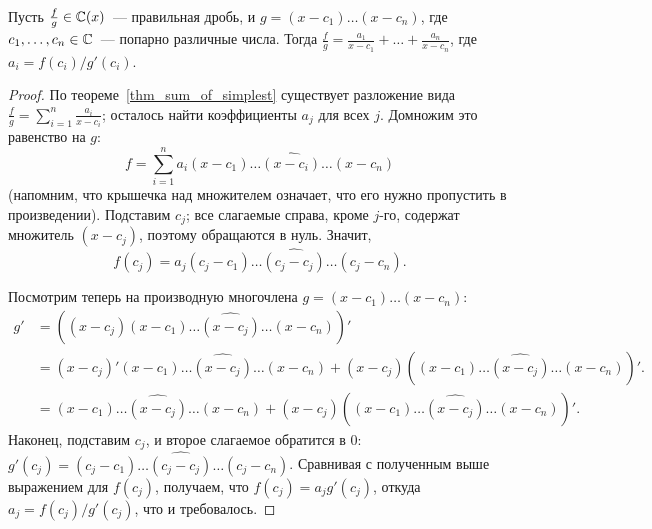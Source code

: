 \begin{proposition}
Пусть $\frac{f}{g}\in\mathbb C(x)$~--- правильная дробь, и $g=(x-c_1)\dots
(x-c_n)$, где $c_1,\dots,c_n\in\mathbb C$~--- попарно различные числа.
Тогда $\frac{f}{g}=\frac{a_1}{x-c_1}+\dots+\frac{a_n}{x-c_n}$, где
$a_i=f(c_i)/g'(c_i)$.
\end{proposition}
\begin{proof}
По теореме~\ref{thm_sum_of_simplest} существует разложение вида
$\frac{f}{g}=\sum_{i=1}^n\frac{a_i}{x-c_i}$; осталось
найти коэффициенты $a_j$ для всех $j$.
Домножим это равенство на $g$:
$$
f=\sum_{i=1}^n a_i(x-c_1)\dots\widehat{(x-c_i)}\dots(x-c_n)
$$
(напомним, что крышечка над множителем означает, что его нужно
пропустить в произведении).
Подставим $c_j$; все слагаемые справа, кроме $j$-го, содержат
множитель $(x-c_j)$, поэтому обращаются в нуль. Значит,
$$
f(c_j)=a_j(c_j-c_1)\dots\widehat{(c_j-c_j)}\dots(c_j-c_n).
$$

Посмотрим теперь на производную многочлена
$g=(x-c_1)\dots(x-c_n)$:
\begin{align*}
g'&=((x-c_j)(x-c_1)\dots\widehat{(x-c_j)}\dots(x-c_n))'\\
&=(x-c_j)'(x-c_1)\dots\widehat{(x-c_j)}\dots(x-c_n)+
 (x-c_j)((x-c_1)\dots\widehat{(x-c_j)}\dots(x-c_n))'.\\
&=(x-c_1)\dots\widehat{(x-c_j)}\dots(x-c_n)+
 (x-c_j)((x-c_1)\dots\widehat{(x-c_j)}\dots(x-c_n))'.
\end{align*}
Наконец, подставим $c_j$, и второе слагаемое обратится в $0$:
$g'(c_j)=(c_j-c_1)\dots\widehat{(c_j-c_j)}\dots(c_j-c_n)$.
Сравнивая с полученным выше выражением для $f(c_j)$, получаем, что
$f(c_j)=a_jg'(c_j)$, откуда $a_j=f(c_j)/g'(c_j)$, что и требовалось.
\end{proof}
